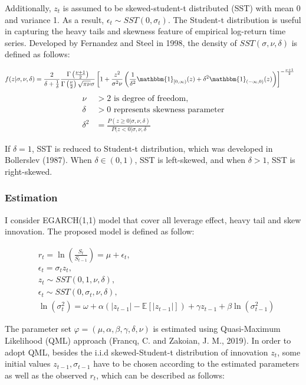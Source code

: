 \documentclass[12pt,a4paper]{article}
\numberwithin{equation}{section}
\begin{document}
Additionally, $z_t$ is assumed to be skewed-student-t distributed (SST) with mean 0 and variance 1. As a result, $\epsilon_t \sim SST(0, \sigma_t)$. The Student-t distribution is useful in capturing the heavy tails and skewness feature of empirical log-return time series. Developed by Fernandez and Steel in 1998, the density of $SST(\sigma, \nu, \delta)$ is defined as follows:


\begin{align}
f(z|\sigma, \nu, \delta) &= \frac{2}{\delta+ \frac{1}{\delta}} \frac{\Gamma\left(\frac{\nu + 1}{2}\right)}{\Gamma\left(\frac{\nu}{2}\right) \sqrt{\pi \nu}\sigma}
\left[ 1 + \frac{z^2}{\sigma^2 \nu} \left( \frac{1}{\delta^2} \mathbbm{1}_{[0, \infty)} (z) + \delta^2 \mathbbm{1}_{(-\infty, 0)} (z) \right) \right]^{-\frac{\nu + 1}{2}}
\end{align}
\begin{align}
\nu &>2 \text{ is degree of freedom}, \\
\delta&>0 \text{ represents skewness parameter}\\
\delta^2 &= \frac{P(z \ge 0| \sigma, \nu, \delta)}{P(z < 0| \sigma, \nu, \delta}
\end{align}

If $\delta = 1$, SST is reduced to Student-t distribution, which was developed in Bollerslev (1987). When $\delta  \in (0,1)$, SST is left-skewed, and when $\delta > 1$, SST is right-skewed.

\subsubsection{Estimation}

I consider EGARCH(1,1) model that cover all leverage effect, heavy tail and skew innovation. The proposed model is defined as follow:

\begin{align*}
 &r_t = \ln \left(\frac{S_t}{S_{t-1}}\right) = \mu + \epsilon_t ,\\
 &\epsilon_t = \sigma_t z_t,\\
 &z_t \sim SST(0, 1, \nu, \delta), \\
 &\epsilon_t \sim SST(0, \sigma_t, \nu, \delta), \\
 &\ln\left(\sigma_t^2\right) = \omega + \alpha \left( |z_{t-1}| - \mathbb{E}[|z_{t-1}|] \right) + \gamma z_{t-1} +  \beta \ln\left(\sigma_{t-1}^2\right)
 \end{align*}

The parameter set $ \varphi = (\mu, \alpha, \beta, \gamma, \delta, \nu)$ is estimated using Quasi-Maximum Likelihood (QML) approach (Francq, C. and Zakoian, J. M., 2019). In order to adopt QML, besides the i.i.d skewed-Student-t distribution of innovation $z_t$, some initial values $z_{t-1}, \sigma_{t-1}$  have to be chosen according to the estimated parameters as well as the observed $r_t$, which can be described as follows:
\end{document}
